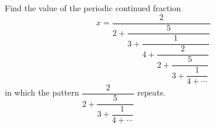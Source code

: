 Find the value of the periodic continued fraction
\[x=\dfrac{2}{2+\dfrac{5}{3+\dfrac{1}{4+\dfrac{2}{2+\dfrac{5}{3+\dfrac{1}{4+\cdots}}}}}}\]
in which the pattern $\dfrac{2}{2+\dfrac{5}{3+\dfrac{1}{4+\cdots}}}$ repeats.
